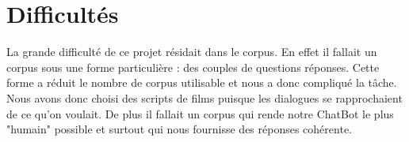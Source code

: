 \section{Difficultés}
La grande difficulté de ce projet résidait dans le corpus. En effet il fallait un corpus sous une forme particulière : des couples de questions réponses. Cette forme a réduit le nombre de corpus utilisable et nous a donc compliqué la tâche. Nous avons donc choisi des scripts de films puisque les dialogues se rapprochaient de ce qu'on voulait.
De plus il fallait un corpus qui rende notre ChatBot le plus "humain" possible et surtout qui nous fournisse des réponses cohérente.